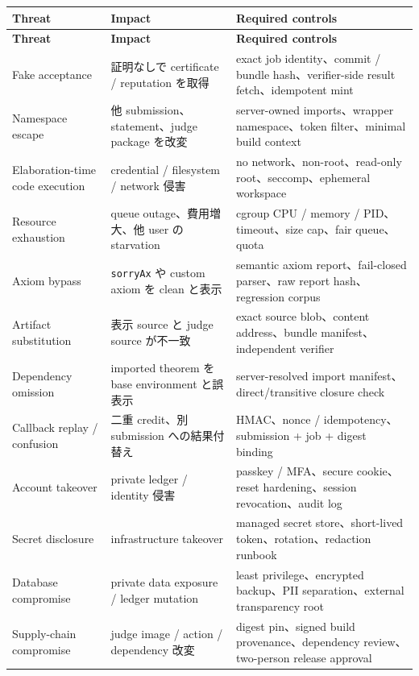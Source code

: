 \documentclass[a4paper,11pt]{ltjsarticle}
\begin{document}
\begin{longtable}{L{31mm}L{49mm}L{68mm}}
\toprule
\textbf{Threat} & \textbf{Impact} & \textbf{Required controls} \\
\midrule
\endfirsthead
\toprule
\textbf{Threat} & \textbf{Impact} & \textbf{Required controls} \\
\midrule
\endhead
Fake acceptance & 証明なしで certificate / reputation を取得 & exact job identity、commit / bundle hash、verifier-side result fetch、idempotent mint \\
Namespace escape & 他 submission、statement、judge package を改変 & server-owned imports、wrapper namespace、token filter、minimal build context \\
Elaboration-time code execution & credential / filesystem / network 侵害 & no network、non-root、read-only root、seccomp、ephemeral workspace \\
Resource exhaustion & queue outage、費用増大、他 user の starvation & cgroup CPU / memory / PID、timeout、size cap、fair queue、quota \\
Axiom bypass & \texttt{sorryAx} や custom axiom を clean と表示 & semantic axiom report、fail-closed parser、raw report hash、regression corpus \\
Artifact substitution & 表示 source と judge source が不一致 & exact source blob、content address、bundle manifest、independent verifier \\
Dependency omission & imported theorem を base environment と誤表示 & server-resolved import manifest、direct/transitive closure check \\
Callback replay / confusion & 二重 credit、別 submission への結果付替え & HMAC、nonce / idempotency、submission + job + digest binding \\
Account takeover & private ledger / identity 侵害 & passkey / MFA、secure cookie、reset hardening、session revocation、audit log \\
Secret disclosure & infrastructure takeover & managed secret store、short-lived token、rotation、redaction runbook \\
Database compromise & private data exposure / ledger mutation & least privilege、encrypted backup、PII separation、external transparency root \\
Supply-chain compromise & judge image / action / dependency 改変 & digest pin、signed build provenance、dependency review、two-person release approval \\
\bottomrule
\end{longtable}
\end{document}
